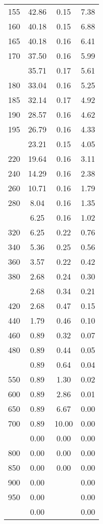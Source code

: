 \begin{table}[ht]
\begin{tabular}{lccc}
  155 & 42.86 & 0.15 & 7.38 \\ 
  160 & 40.18 & 0.15 & 6.88 \\ 
  165 & 40.18 & 0.16 & 6.41 \\ 
  170 & 37.50 & 0.16 & 5.99 \\ 
   \addlinespace
175 & 35.71 & 0.17 & 5.61 \\ 
  180 & 33.04 & 0.16 & 5.25 \\ 
  185 & 32.14 & 0.17 & 4.92 \\ 
  190 & 28.57 & 0.16 & 4.62 \\ 
  195 & 26.79 & 0.16 & 4.33 \\ 
   \addlinespace
200 & 23.21 & 0.15 & 4.05 \\ 
  220 & 19.64 & 0.16 & 3.11 \\ 
  240 & 14.29 & 0.16 & 2.38 \\ 
  260 & 10.71 & 0.16 & 1.79 \\ 
  280 & 8.04 & 0.16 & 1.35 \\ 
   \addlinespace
300 & 6.25 & 0.16 & 1.02 \\ 
  320 & 6.25 & 0.22 & 0.76 \\ 
  340 & 5.36 & 0.25 & 0.56 \\ 
  360 & 3.57 & 0.22 & 0.42 \\ 
  380 & 2.68 & 0.24 & 0.30 \\ 
   \addlinespace
400 & 2.68 & 0.34 & 0.21 \\ 
  420 & 2.68 & 0.47 & 0.15 \\ 
  440 & 1.79 & 0.46 & 0.10 \\ 
  460 & 0.89 & 0.32 & 0.07 \\ 
  480 & 0.89 & 0.44 & 0.05 \\ 
   \addlinespace
500 & 0.89 & 0.64 & 0.04 \\ 
  550 & 0.89 & 1.30 & 0.02 \\ 
  600 & 0.89 & 2.86 & 0.01 \\ 
  650 & 0.89 & 6.67 & 0.00 \\ 
  700 & 0.89 & 10.00 & 0.00 \\ 
   \addlinespace
750 & 0.00 & 0.00 & 0.00 \\ 
  800 & 0.00 & 0.00 & 0.00 \\ 
  850 & 0.00 & 0.00 & 0.00 \\ 
  900 & 0.00 &  & 0.00 \\ 
  950 & 0.00 &  & 0.00 \\ 
   \addlinespace
1000 & 0.00 &  & 0.00 \\ 
   \bottomrule
\end{tabular}
\end{table}
